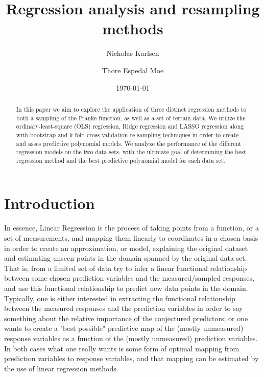 \documentclass[reprint, english, nofootinbib]{revtex4-2}
\begin{document}
\title{Regression analysis and resampling methods}
\author{Nicholas Karlsen}
\author{Thore Espedal Moe}
\date{\today}

\begin{abstract}
    \noindent
   In this paper we aim to explore the application of three distinct regression methods to both a sampling of the Franke function, as well as a set of terrain data. We utilize the ordinary-least-square (OLS) regression, Ridge regression and LASSO regression along with bootstrap and k-fold cross-validation re-sampling techniques in order to create and asses predictive polynomial models. We analyze the performance of the different regression models on the two data sets, with the ultimate goal of determining the best regression method and the best predictive polynomial model for each data set.
\end{abstract}

\maketitle

\section{Introduction}
    \noindent
        In essence, Linear Regression is the process of taking points from a function, or a set of measurements, and mapping them linearly to coordinates in a chosen basis in order to create an approximation, or model, explaining the original dataset and estimating unseen points in the domain spanned by the original data set. That is, from a limited set of data try to infer a linear functional relationship between some chosen prediction variables and the measured/sampled responses, and use this functional relationship to predict new data points in the domain. Typically, one is either interested in extracting the functional relationship between the measured responses and the prediction variables in order to say something about the relative importance of the conjectured predictors; or one wants to create a "best possible" predictive map of the (mostly unmeasured) response variables as a function of the (mostly unmeasured) prediction variables. In both cases what one really wants is some form of optimal mapping from prediction variables to response variables, and that mapping can be estimated by the use of linear regression methods.
\end{document}
